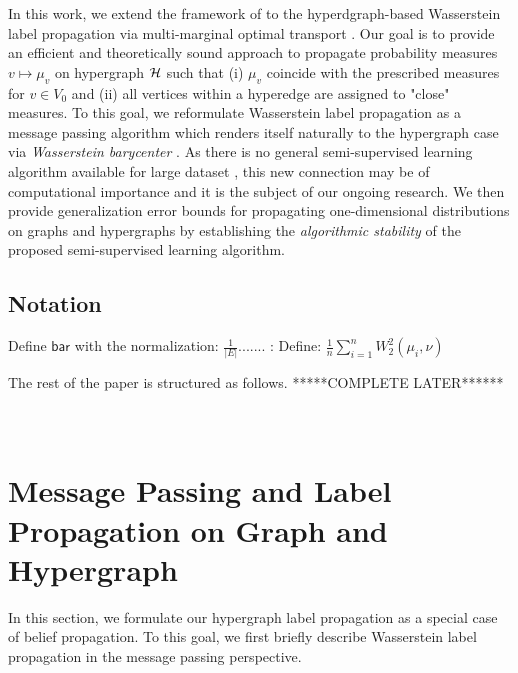 \documentclass[letterpaper]{article} %
\begin{document}
In this work, we extend the framework of \cite{Solomon:2014} to the hyperdgraph-based Wasserstein label propagation via multi-marginal optimal transport \cite{CE2010}. Our goal is to provide an efficient and theoretically sound approach to propagate probability measures $v\mapsto \mu_v$ on hypergraph ${\mathcal H}$ such that (i) $\mu_v$ coincide with the prescribed measures for $v\in V_0$ and (ii) all vertices within a hyperedge are assigned to "close" measures. To this goal, we reformulate Wasserstein label propagation \cite{Solomon:2014} as a message passing algorithm which renders  itself  naturally  to the hypergraph case via \textit{Wasserstein barycenter} \cite{Wasserstein_Barycenter, Hypergraph_Asoodeh}. As there is no general semi-supervised learning algorithm available for large dataset \cite{Label_Propa_100}, this new connection may be of computational importance and it is the subject of our ongoing research. We then 
provide generalization error bounds \cite{Generalization_semi} for propagating one-dimensional distributions on graphs and hypergraphs by establishing the \textit{algorithmic stability} \cite{Algorithmic_Stability} of  the  proposed  semi-supervised  learning  algorithm. 


\subsection{Notation}

Define $\mathsf{bar}$  with the normalization: $\frac{1}{|E|}$....... 
{\color{blue}:  Define: $\frac{1}{n}\sum_{i=1}^nW^2_2(\mu_i, \nu)$}

The rest of the paper is structured as follows.  *****COMPLETE LATER******
~\\
~\\
\section{Message Passing and Label Propagation on Graph and Hypergraph}
In this section, we formulate our hypergraph label propagation as a special case of belief propagation. To this goal, we first briefly describe Wasserstein label propagation \cite{Solomon:2014} in the message passing perspective.
\end{document}
